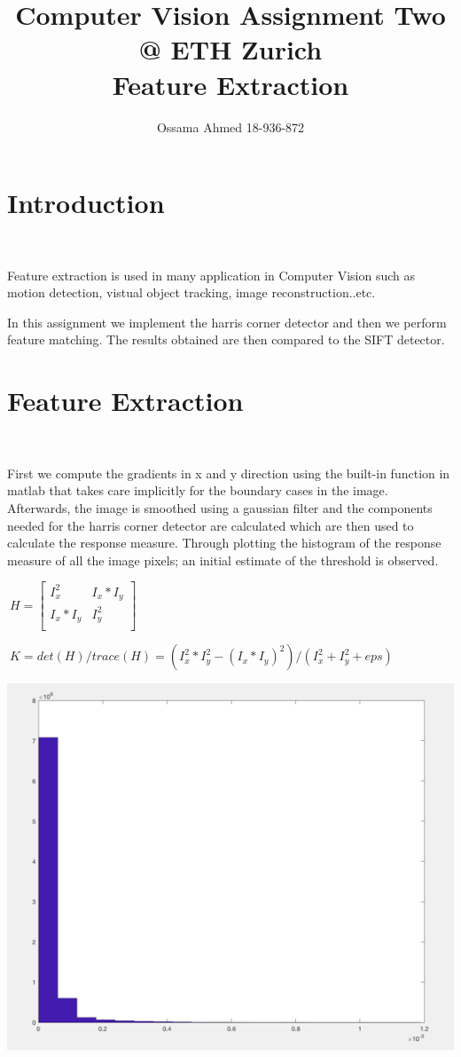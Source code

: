 \documentclass[]{article}
\title{Computer Vision Assignment Two @ ETH Zurich \\ \large Feature Extraction}
\author{Ossama Ahmed 18-936-872}
\begin{document}
\maketitle

\section{Introduction}\

Feature extraction is used in many application in Computer Vision such as motion detection, vistual object tracking, image reconstruction..etc. 

In this assignment we implement the harris corner detector and then we perform feature matching. The results obtained are then compared to the SIFT detector.
\newline

\section{Feature Extraction}\



First we compute the gradients in  x and y direction using the built-in function in matlab that takes care implicitly for the boundary cases in the image. Afterwards, the image is smoothed using a gaussian filter and the components needed for the harris corner detector are calculated which are then used to calculate the response measure. Through plotting the  histogram of the response measure of all the image pixels; an initial estimate of the threshold is observed.


\medspace
$\
H =
\begin{bmatrix}
I_x^2       & I_x*I_y \\
I_x*I_y      & I_y^2\\
\end{bmatrix}$
\newline
\medspace



$\
K = det(H) / trace(H) = (I_x^2 * I_y^2 - (I_x * I_y)^2) / (I_x^2 + I_y^2 + eps)$

\includegraphics{histogram.png}
\end{document}
